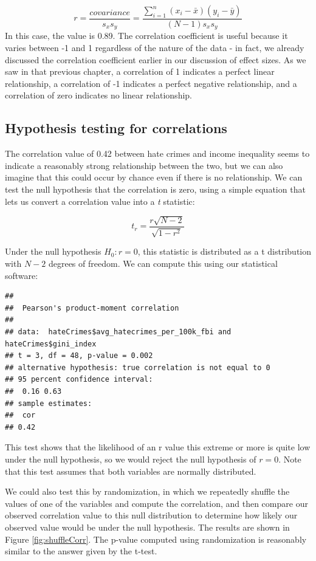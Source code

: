 \documentclass[
  12pt,
]{book}
\begin{document}
\[
r = \frac{covariance}{s_xs_y} = \frac{\sum_{i=1}^n (x_i - \bar{x})(y_i - \bar{y})}{(N - 1)s_x s_y}
\]
In this case, the value is 0.89. The correlation coefficient is useful because it varies between -1 and 1 regardless of the nature of the data - in fact, we already discussed the correlation coefficient earlier in our discussion of effect sizes. As we saw in that previous chapter, a correlation of 1 indicates a perfect linear relationship, a correlation of -1 indicates a perfect negative relationship, and a correlation of zero indicates no linear relationship.

\hypertarget{hypothesis-testing-for-correlations}{%
\subsection{Hypothesis testing for correlations}\label{hypothesis-testing-for-correlations}}

The correlation value of 0.42 between hate crimes and income inequality seems to indicate a reasonably strong relationship between the two, but we can also imagine that this could occur by chance even if there is no relationship. We can test the null hypothesis that the correlation is zero, using a simple equation that lets us convert a correlation value into a \emph{t} statistic:

\[
\textit{t}_r =  \frac{r\sqrt{N-2}}{\sqrt{1-r^2}}
\]

Under the null hypothesis \(H_0:r=0\), this statistic is distributed as a t distribution with \(N - 2\) degrees of freedom. We can compute this using our statistical software:

\begin{verbatim}
## 
##  Pearson's product-moment correlation
## 
## data:  hateCrimes$avg_hatecrimes_per_100k_fbi and hateCrimes$gini_index
## t = 3, df = 48, p-value = 0.002
## alternative hypothesis: true correlation is not equal to 0
## 95 percent confidence interval:
##  0.16 0.63
## sample estimates:
##  cor 
## 0.42
\end{verbatim}

This test shows that the likelihood of an r value this extreme or more is quite low under the null hypothesis, so we would reject the null hypothesis of \(r=0\). Note that this test assumes that both variables are normally distributed.

We could also test this by randomization, in which we repeatedly shuffle the values of one of the variables and compute the correlation, and then compare our observed correlation value to this null distribution to determine how likely our observed value would be under the null hypothesis. The results are shown in Figure \ref{fig:shuffleCorr}. The p-value computed using randomization is reasonably similar to the answer given by the t-test.
\end{document}
